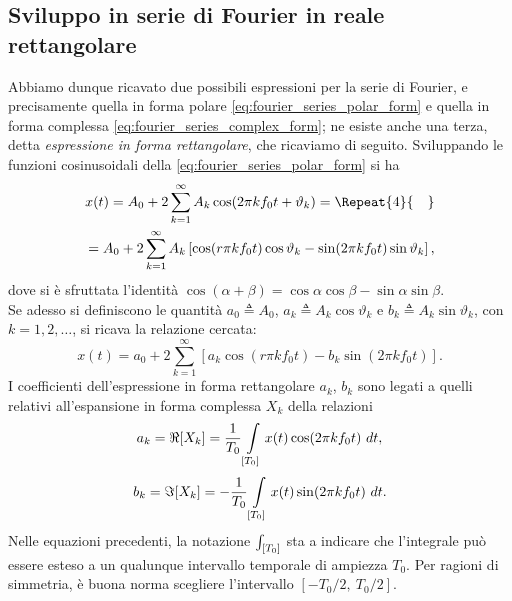 \documentclass[12pt,oneside,openany]{memoir}
\numberwithin{equation}{subsection}
\newcommand{\quads}[1]{\Repeat{#1}{\quad}}
\newcommand{\dt}{\ dt}
\begin{document}
\subsection{Sviluppo in serie di Fourier in reale rettangolare}
Abbiamo dunque ricavato due possibili espressioni per la serie di Fourier, e precisamente quella in forma polare \eqref{eq:fourier_series_polar_form} e quella in forma complessa \eqref{eq:fourier_series_complex_form}; ne esiste anche una terza, detta \textit{espressione in forma rettangolare}, che ricaviamo di seguito. Sviluppando le funzioni cosinusoidali della \eqref{eq:fourier_series_polar_form} si ha
\begin{equation}
\begin{split}
	x(t) = A_0 + 2 \sum_{k = 1}^{\infty} A_k \cos(2 \pi k f_0 t + \vartheta_k) =
	\quads{4}
	\\
	= A_0 + 2 \sum_{k = 1}^{\infty} A_k \left[\cos(r \pi k f_0 t) \cos\vartheta_k - \sin(2 \pi k f_0 t) \sin\vartheta_k\right],
\end{split}
\end{equation}
dove si \`e sfruttata l'identit\`a $\cos(\alpha + \beta) = \cos\alpha \cos\beta - \sin\alpha \sin\beta$.\\
Se adesso si definiscono le quantit\`a $a_0 \triangleq A_0$, $a_k \triangleq A_k \cos\vartheta_k$ e $b_k \triangleq A_k \sin\vartheta_k$, con $k = 1, 2, \dots$, si ricava la relazione cercata:
\begin{equation}
	x(t) = a_0 + 2 \sum_{k = 1}^{\infty} \left[a_k \cos(r \pi k f_0 t) - b_k \sin(2 \pi k f_0 t)\right].
\end{equation}
I coefficienti dell'espressione in forma rettangolare $a_k$, $b_k$ sono legati a quelli relativi all'espansione in forma complessa $X_k$ della relazioni
\begin{equation}
	a_k = \Re[X_k] = \frac{1}{T_0} \int\displaylimits_{[T_0]} x(t) \cos(2 \pi k f_0 t) \dt,
\end{equation}
\begin{equation}
	b_k = \Im[X_k] = -\frac{1}{T_0} \int\displaylimits_{[T_0]} x(t) \sin(2 \pi k f_0 t) \dt.
\end{equation}
Nelle equazioni precedenti, la notazione $\int\displaylimits_{[T_0]}$ sta a indicare che l'integrale pu\`o essere esteso a un qualunque intervallo temporale di ampiezza $T_0$. Per ragioni di simmetria, \`e buona norma scegliere l'intervallo $[-T_0/2, \ T_0/2]$.
\end{document}
